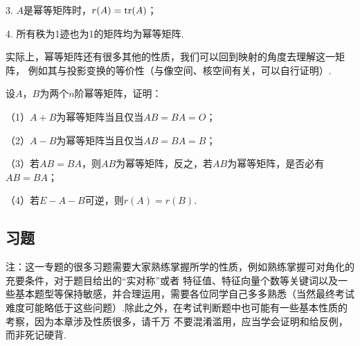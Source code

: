 3. $A$是幂等矩阵时，$r(A)=\textup{tr}(A)$；

4. 所有秩为1迹也为1的矩阵均为幂等矩阵.

实际上，幂等矩阵还有很多其他的性质，我们可以回到映射的角度去理解这一矩阵，
例如其与投影变换的等价性（与像空间、核空间有关，可以自行证明）.
\begin{example}
	设$A$，$B$为两个$n$阶幂等矩阵，证明：

	\textup{（1）}$A+B$为幂等矩阵当且仅当$AB=BA=O$；

	\textup{（2）}$A-B$为幂等矩阵当且仅当$AB=BA=B$；

	\textup{（3）}若$AB=BA$，则$AB$为幂等矩阵，反之，若$AB$为幂等矩阵，是否必有$AB=BA$；

	\textup{（4）}若$E-A-B$可逆，则$r(A)=r(B)$.
\end{example}
\subsection{习题}
注：这一专题的很多习题需要大家熟练掌握所学的性质，例如熟练掌握可对角化的充要条件，对于题目给出的“实对称”或者
特征值、特征向量个数等关键词以及一些基本题型等保持敏感，并合理运用，需要各位同学自己多多熟悉（当然最终考试
难度可能略低于这些问题）.除此之外，在考试判断题中也可能有一些基本性质的考察，因为本章涉及性质很多，请千万
不要混淆滥用，应当学会证明和给反例，而非死记硬背.

